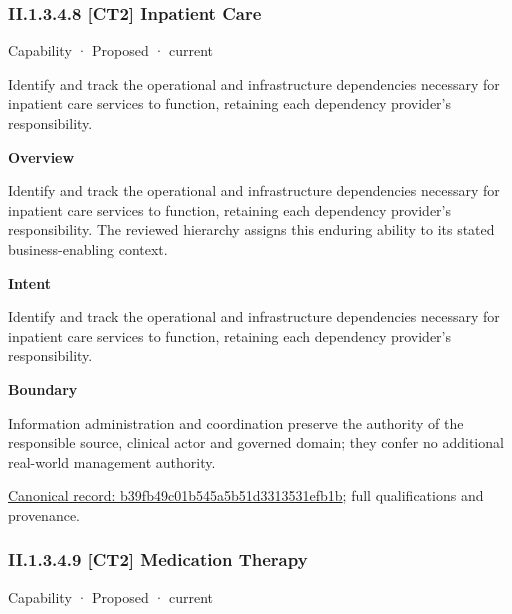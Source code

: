 \subsubsection*{II.1.3.4.8 [CT2] Inpatient Care}
\label{navigation:II.1.3.4.8}

\label{element:b39fb49c01b545a5b51d3313531efb1b}
{\small Capability · Proposed · current}\par

Identify and track the operational and infrastructure dependencies necessary for inpatient care services to function, retaining each dependency provider's responsibility.



\textbf{Overview}



Identify and track the operational and infrastructure dependencies necessary for inpatient care services to function, retaining each dependency provider's responsibility. The reviewed hierarchy assigns this enduring ability to its stated business-enabling context.



\textbf{Intent}



Identify and track the operational and infrastructure dependencies necessary for inpatient care services to function, retaining each dependency provider's responsibility.



\textbf{Boundary}



Information administration and coordination preserve the authority of the responsible source, clinical actor and governed domain; they confer no additional real-world management authority.


{\footnotesize \href{../../../../continuum/strategy/capability/b39fb49c01b545a5b51d3313531efb1b.md}{Canonical record: b39fb49c01b545a5b51d3313531efb1b}; full qualifications and provenance.}\par
\subsubsection*{II.1.3.4.9 [CT2] Medication Therapy}
\label{navigation:II.1.3.4.9}

\label{element:bb04996164c94e0c827a020432f4e498}
{\small Capability · Proposed · current}\par

